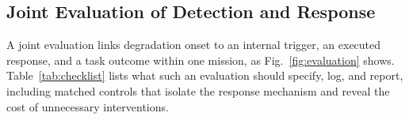 \subsection{Joint Evaluation of Detection and Response}

A joint evaluation links degradation onset to an internal trigger, an executed response, and a task outcome within one mission, as Fig.~\ref{fig:evaluation} shows. Table~\ref{tab:checklist} lists what such an evaluation should specify, log, and report, including matched controls that isolate the response mechanism and reveal the cost of unnecessary interventions.
